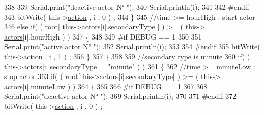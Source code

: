 \begin{DoxyCode}
338                             
339                                 Serial.print(\textcolor{stringliteral}{"deactive actor N° "});
340                                 Serial.println(i);
341                         
342 \textcolor{preprocessor}{                            #endif  }
343                                 bitWrite( this->\hyperlink{class_jetpack_aca3142925a7b0834b34ae91d26af7765}{action} , i , 0 ) ;    
344                             \}
345                             \textcolor{comment}{//time >= hourHigh : start actor}
346                             \textcolor{keywordflow}{else} \textcolor{keywordflow}{if}( ( root[ this->\hyperlink{class_jetpack_a7e16d2f97837f9712a2e6de1c50d99db}{actors}[i].secondaryType ] ) >= ( this->
      \hyperlink{class_jetpack_a7e16d2f97837f9712a2e6de1c50d99db}{actors}[i].hourHigh ) )
347                             \{
348                         
349 \textcolor{preprocessor}{                            #if DEBUG == 1 }
350                         
351                                 Serial.print(\textcolor{stringliteral}{"active actor N° "});
352                                 Serial.println(i);
353                         
354 \textcolor{preprocessor}{                            #endif}
355                                 bitWrite( this->\hyperlink{class_jetpack_aca3142925a7b0834b34ae91d26af7765}{action} , i , 1 ) ;                    
356                             \}
357                         \}
358 
359                         \textcolor{comment}{//secondary type is minute  }
360                         \textcolor{keywordflow}{if}( ( this->\hyperlink{class_jetpack_a7e16d2f97837f9712a2e6de1c50d99db}{actors}[i].secondaryType==\textcolor{stringliteral}{"minute"} ) )
361                         \{
362                             \textcolor{comment}{//time >= minuteLow : stop actor}
363                             \textcolor{keywordflow}{if}( ( root[this->\hyperlink{class_jetpack_a7e16d2f97837f9712a2e6de1c50d99db}{actors}[i].secondaryType] ) >= ( this->
      \hyperlink{class_jetpack_a7e16d2f97837f9712a2e6de1c50d99db}{actors}[i].minuteLow ) )   
364                             \{
365                         
366 \textcolor{preprocessor}{                            #if DEBUG == 1 }
367                             
368                                 Serial.print(\textcolor{stringliteral}{"deactive actor N° "});
369                                 Serial.println(i);
370                         
371 \textcolor{preprocessor}{                            #endif  }
372                                 bitWrite( this->\hyperlink{class_jetpack_aca3142925a7b0834b34ae91d26af7765}{action} , i , 0 ) ;    

\end{DoxyCode}
